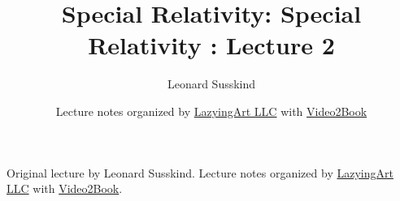 \documentclass[11pt,oneside]{book}
\begin{document}
\frontmatter
\title{Special Relativity: Special Relativity : Lecture 2}
\author{Leonard Susskind}
\date{Lecture notes organized by \href{https://lazying.art}{LazyingArt LLC} with \href{https://github.com/lachlanchen/Video2Book}{Video2Book}}
\maketitle
\begin{center}
\small Original lecture by Leonard Susskind. Lecture notes organized by \href{https://lazying.art}{LazyingArt LLC} with \href{https://github.com/lachlanchen/Video2Book}{Video2Book}.
\end{center}
\clearpage
\mainmatter

\end{document}
